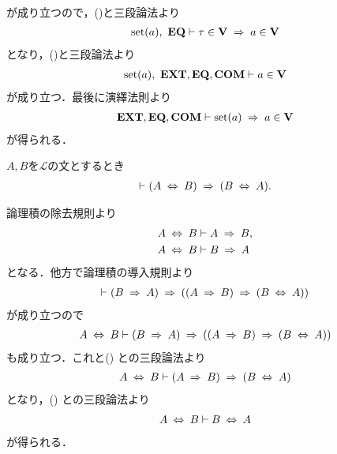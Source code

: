 \begin{prf}
\begin{align}
		\end{align}
		が成り立つので，()と三段論法より
		\begin{align}
			\set{a},\ \EQAX \vdash \tau \in \Univ \rarrow a \in \Univ
		\end{align}
		となり，()と三段論法より
		\begin{align}
			\set{a},\ \EXTAX,\EQAX,\COMAX \vdash a \in \Univ
		\end{align}
		が成り立つ．最後に演繹法則より
		\begin{align}
			\EXTAX,\EQAX,\COMAX \vdash \set{a} \rarrow a \in \Univ
		\end{align}
		が得られる．
		\QED
	\end{prf}
	
	\begin{screen}
		\begin{logicalthm}[同値関係の可換律]
		\label{logicalthm:commutative_law_of_equivalence_symbol}
			$A,B$を$\mathcal{L}$の文とするとき
			\begin{align}
				\vdash (A \lrarrow B) \rarrow (B \lrarrow A).
			\end{align}
		\end{logicalthm}
	\end{screen}
	
	\begin{sketch}
		論理積の除去規則より
		\begin{align}
			A \lrarrow B &\vdash A \rarrow B, 
			\label{fom:logicalthm_commutative_law_of_equivalence_symbol_1} \\
			A \lrarrow B &\vdash B \rarrow A
			\label{fom:logicalthm_commutative_law_of_equivalence_symbol_2}
		\end{align}
		となる．他方で論理積の導入規則より
		\begin{align}
			\vdash (B \rarrow A) \rarrow ((A \rarrow B) \rarrow (B \lrarrow A))
		\end{align}
		が成り立つので
		\begin{align}
			A \lrarrow B \vdash (B \rarrow A) \rarrow ((A \rarrow B) \rarrow (B \lrarrow A))
		\end{align}
		も成り立つ．これと()
		との三段論法より
		\begin{align}
			A \lrarrow B \vdash (A \rarrow B) \rarrow (B \lrarrow A)
		\end{align}
		となり，()
		との三段論法より
		\begin{align}
			A \lrarrow B \vdash B \lrarrow A
		\end{align}
		が得られる．
		\QED
	\end{sketch}
	
